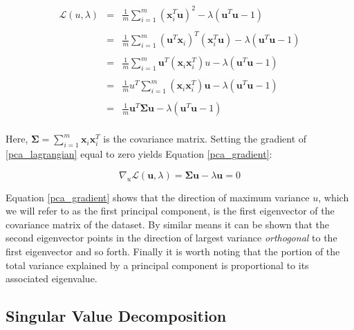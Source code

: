 \documentclass[11pt, oneside, a4paper]{report}
\begin{document}
  \begin{equation}
    \label{pca_lagrangian}
    \begin{array}{lcl}
      \mathcal{L}(u,\lambda) & = & \frac{1}{m} \sum_{i=1}^m (\boldsymbol{x}_i^T \boldsymbol{u})^2 - \lambda (\boldsymbol{u}^T \boldsymbol{u} -1) \\
      \\& = & \frac{1}{m} \sum_{i=1}^m (\boldsymbol{u}^T \boldsymbol{x}_i)^T(\boldsymbol{x}_i^T \boldsymbol{u}) - \lambda (\boldsymbol{u}^T \boldsymbol{u} -1) \\
      \\& = & \frac{1}{m} \sum_{i=1}^m \boldsymbol{u}^T(\boldsymbol{x}_i \boldsymbol{x}_i^T)u - \lambda (\boldsymbol{u}^T \boldsymbol{u} -1) \\
      \\& = & \frac{1}{m}  u^T\sum_{i=1}^m(\boldsymbol{x}_i \boldsymbol{x}_i^T)\boldsymbol{u} - \lambda (\boldsymbol{u}^T \boldsymbol{u} -1) \\
      \\& = & \frac{1}{m} \boldsymbol{u}^T \boldsymbol{\Sigma} \boldsymbol{u} - \lambda (\boldsymbol{u}^T \boldsymbol{u} -1) \\
    \end{array}
  \end{equation}

Here, $\boldsymbol{\Sigma} = \sum_{i = 1}^m \boldsymbol{x}_i
\boldsymbol{x}_i^T$ is the covariance matrix. Setting the gradient of
\ref{pca_lagrangian} equal to zero yields Equation \ref{pca_gradient}:


\begin{equation}
  \label{pca_gradient}
  \nabla_u \mathcal{L}(\boldsymbol{u}, \lambda) = \boldsymbol{\Sigma} \boldsymbol{u} - \lambda \boldsymbol{u} = 0
\end{equation}

Equation \ref{pca_gradient} shows that the direction of maximum
variance $u$, which we will refer to as the first principal component,
is the first eigenvector of the covariance matrix of the dataset. By
similar means it can be shown that the second eigenvector points in
the direction of largest variance \emph{orthogonal} to the first
eigenvector and so forth. Finally it is worth noting that the portion
of the total variance explained by a principal component is
proportional to its associated eigenvalue.


\subsection{Singular Value Decomposition}
\end{document}
